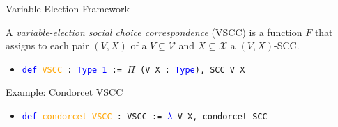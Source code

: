 \documentclass[12pt,xcolor=svgnames,blue,aspectratio=169]{beamer}
\begin{document}
\begin{frame}{Variable-Election Framework}

\begin{definition}\label{VSCC} A \textit{variable-election social choice correspondence} (VSCC) is a function $F$ that assigns to each pair $(V,X)$ of a $V\subseteq \mathcal{V}$ and $X\subseteq\mathcal{X}$ a $(V,X)$-SCC. %
\end{definition}

 
\begin{itemize}
\item[] \texttt{\textcolor{blue}{def} \textcolor{orange}{VSCC} : \textcolor{blue}{Type 1} := $\Pi$ (V X : \textcolor{blue}{Type}), SCC V X}
\end{itemize}



\vfill 
\vfill 

Example: Condorcet VSCC\\
\begin{itemize}
\item[] \texttt{\textcolor{blue}{def} \textcolor{orange}{condorcet\_VSCC} : VSCC := \textcolor{blue}{$\lambda$} V X, condorcet\_SCC}
\end{itemize}

\end{frame}
\end{document}
